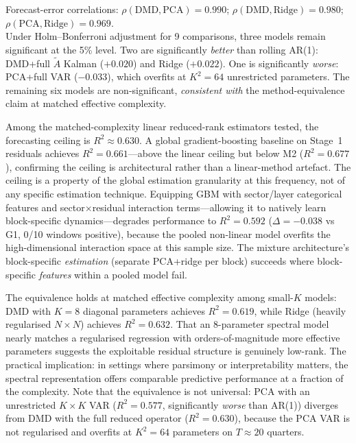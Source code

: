 \documentclass[11pt,a4paper]{article}
\begin{document}
\begin{table}[H]
\vspace{0.3em}
{\footnotesize Forecast-error correlations: $\rho(\text{DMD}, \text{PCA}) = 0.990$; $\rho(\text{DMD}, \text{Ridge}) = 0.980$; $\rho(\text{PCA}, \text{Ridge}) = 0.969$.\\
Under Holm--Bonferroni adjustment for 9 comparisons, three models remain significant at the 5\% level. Two are significantly \emph{better} than rolling AR(1): DMD+full $\tilde{A}$ Kalman ($+0.020$) and Ridge ($+0.022$). One is significantly \emph{worse}: PCA+full VAR ($-0.033$), which overfits at $K^2 = 64$ unrestricted parameters. The remaining six models are non-significant, \emph{consistent with} the method-equivalence claim at matched effective complexity.}
\end{table}

Among the matched-complexity linear reduced-rank estimators tested, the forecasting ceiling is $R^2 \approx 0.630$. A global gradient-boosting baseline on Stage~1 residuals achieves $R^2 = 0.661$---above the linear ceiling but below M2 ($R^2 = 0.677$), confirming the ceiling is architectural rather than a linear-method artefact. The ceiling is a property of the global estimation granularity at this frequency, not of any specific estimation technique. Equipping GBM with sector/layer categorical features and sector$\times$residual interaction terms---allowing it to natively learn block-specific dynamics---degrades performance to $R^2 = 0.592$ ($\Delta = -0.038$ vs G1, 0/10 windows positive), because the pooled non-linear model overfits the high-dimensional interaction space at this sample size. The mixture architecture's block-specific \emph{estimation} (separate PCA+ridge per block) succeeds where block-specific \emph{features} within a pooled model fail.

The equivalence holds at matched effective complexity among small-$K$ models: DMD with $K = 8$ diagonal parameters achieves $R^2 = 0.619$, while Ridge (heavily regularised $N \!\times\! N$) achieves $R^2 = 0.632$. That an 8-parameter spectral model nearly matches a regularised regression with orders-of-magnitude more effective parameters suggests the exploitable residual structure is genuinely low-rank. The practical implication: in settings where parsimony or interpretability matters, the spectral representation offers comparable predictive performance at a fraction of the complexity. Note that the equivalence is not universal: PCA with an unrestricted $K \!\times\! K$ VAR ($R^2 = 0.577$, significantly \emph{worse} than AR(1)) diverges from DMD with the full reduced operator ($R^2 = 0.630$), because the PCA VAR is not regularised and overfits at $K^2 = 64$ parameters on $T \approx 20$ quarters.
\end{document}
